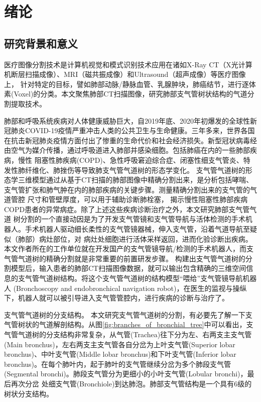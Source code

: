 
\chapter{绪论}\label{chap:introduction}

\section{研究背景和意义}

医疗图像分割技术是计算机视觉和模式识别技术应用在诸如X-Ray CT（X光计算机断层扫描成像）、MRI（磁共振成像）和Ultrasound（超声成像）等医疗图像上，
针对特定的目标，譬如肺部动脉/静脉血管、乳腺肿块，肺癌结节，进行逐体素(Voxel)的分类。本文聚焦肺部CT扫描图像，研究肺部支气管树状结构的气道分割提取技术。


肺部和呼吸系统疾病对人体健康威胁巨大，自2019年底、2020年初爆发的全球性新冠肺炎COVID-19疫情严重冲击人类的公共卫生与生命健康。三年多来，世界各国在抗击新冠肺炎疫情方面付出了惨重的生命代价和社会经济损失。新型冠状病毒经由空气为媒介传播，通过呼吸道进入肺部并感染细胞。包括肺癌在内的一些肺部疾病，慢性
阻塞性肺疾病(COPD)\cite{fetita2004pulmonary}、急性呼吸窘迫综合症\cite{howling1998significance}、闭塞性细支气管炎\cite{shaw2002role}、特发性肺纤维化\cite{wu2019computed}、肺挫伤\cite{li2019application}等导致肺支气管气道树的形态学变化。
支气管气道树的形态学三维模型通过从基于CT扫描的肺部图像中精确分割出来，是分析包括哮喘、支气管扩张和肺气肿在内的肺部疾病的关键步骤。测量精确分割出来的支气管的气道管腔
尺寸和管壁厚度，可以用于辅助诊断肺栓塞\cite{estepar2013computed}， 揭示慢性阻塞性肺部疾病COPD患者的异常病症。除了上述这些疾病诊断治疗之外，本文研究肺部支气管气道
树分割的一个直接动因是为了开发支气管镜和支气管导航与活体检测的手术机器人。手术机器人驱动细长柔性的支气管镜器械，伸入支气管，沿着气道导航至疑似（肺部）病灶部位，对
病灶处细胞进行活体采样返回，进而化验诊断出疾病。本文作者所在的工作单位就在开发国产的支气管镜导航/检测的手术机器人，而支气管气道树的精确分割就是非常重要的前置研发步骤。
构建出支气管气道树的分割模型后，输入患者的肺部CT扫描图像数据，就可以输出包含精确的三维空间信息的支气管气道树结构。将这个支气管气道树的结构模型“喂给”支气管镜导航机器人
(Bronchoscopy and endobronchical navigation robot)，在医生的监视与操纵下，机器人就可以被引导进入支气管管腔内，进行疾病的诊断与治疗了。

{\heiti 支气管气道树的分支结构。} 本文研究支气管气道树的分割，有必要先了解一下支气管树状的气道解剖结构。从图\ref{fig:branches_of_bronchial_tree}中可以看出，支气管气道树的分支结构非常复杂，从气管(Trachea)往下分为左、右两支主支气管(Main bronchus)，左右两支主支气管各自分岔为上叶支气管(Superior lobar bronchus)、中叶支气管(Middle lobar bronchus)和下叶支气管(Inferior
 lobar bronchus)。在每个肺叶内，起于肺叶的支气管继续分岔为多个肺段支气管(Segmental bronchi)。肺段支气管分为更细小的小叶支气管(Lobular bronchi)，最后再次分岔
 处细支气管(Bronchiole)到达肺泡。肺部支气管结构是一个具有6级的树状分支结构。

